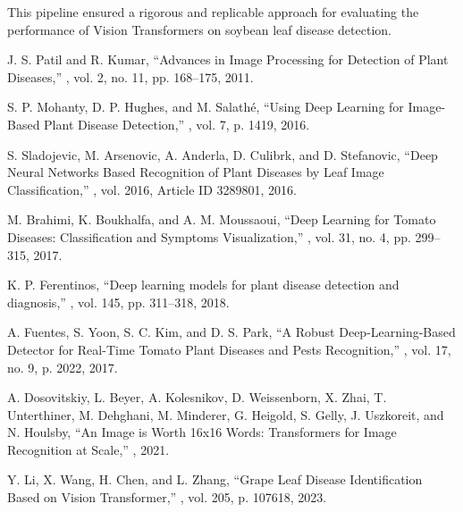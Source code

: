 \documentclass[preprint,12pt]{elsarticle}
\begin{document}
This pipeline ensured a rigorous and replicable approach for evaluating the performance of Vision Transformers on soybean leaf disease detection.



\begin{thebibliography}{99}

J. S. Patil and R. Kumar,
\newblock ``Advances in Image Processing for Detection of Plant Diseases,''
, vol. 2, no. 11, pp. 168–175, 2011.

S. P. Mohanty, D. P. Hughes, and M. Salathé,
\newblock ``Using Deep Learning for Image-Based Plant Disease Detection,''
, vol. 7, p. 1419, 2016.

S. Sladojevic, M. Arsenovic, A. Anderla, D. Culibrk, and D. Stefanovic,
\newblock ``Deep Neural Networks Based Recognition of Plant Diseases by Leaf Image Classification,''
, vol. 2016, Article ID 3289801, 2016.

M. Brahimi, K. Boukhalfa, and A. M. Moussaoui,
\newblock ``Deep Learning for Tomato Diseases: Classification and Symptoms Visualization,''
, vol. 31, no. 4, pp. 299–315, 2017.

K. P. Ferentinos,
\newblock ``Deep learning models for plant disease detection and diagnosis,''
, vol. 145, pp. 311–318, 2018.

A. Fuentes, S. Yoon, S. C. Kim, and D. S. Park,
\newblock ``A Robust Deep-Learning-Based Detector for Real-Time Tomato Plant Diseases and Pests Recognition,''
, vol. 17, no. 9, p. 2022, 2017.

A. Dosovitskiy, L. Beyer, A. Kolesnikov, D. Weissenborn, X. Zhai, T. Unterthiner, M. Dehghani, M. Minderer, G. Heigold, S. Gelly, J. Uszkoreit, and N. Houlsby,
\newblock ``An Image is Worth 16x16 Words: Transformers for Image Recognition at Scale,''
, 2021.

Y. Li, X. Wang, H. Chen, and L. Zhang,
\newblock ``Grape Leaf Disease Identification Based on Vision Transformer,''
, vol. 205, p. 107618, 2023.


\end{thebibliography}
\end{document}
